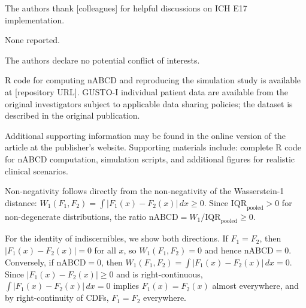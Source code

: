 \documentclass[AMA,Times1COL]{WileyNJDv5}
\begin{document}

The authors thank [colleagues] for helpful discussions on ICH E17 implementation.


None reported.


The authors declare no potential conflict of interests.


R code for computing nABCD and reproducing the simulation study is available at [repository URL]. GUSTO-I individual patient data are available from the original investigators subject to applicable data sharing policies; the dataset is described in the original publication.\cite{gusto1993}




Additional supporting information may be found in the online version of the article at the publisher's website. Supporting materials include: complete R code for nABCD computation, simulation scripts, and additional figures for realistic clinical scenarios.

\appendix



Non-negativity follows directly from the non-negativity of the Wasserstein-1 distance: $W_1(F_1, F_2) = \int |F_1(x) - F_2(x)| \, dx \geq 0$. Since $\text{IQR}_{\text{pooled}} > 0$ for non-degenerate distributions, the ratio $\text{nABCD} = W_1 / \text{IQR}_{\text{pooled}} \geq 0$.

For the identity of indiscernibles, we show both directions. If $F_1 = F_2$, then $|F_1(x) - F_2(x)| = 0$ for all $x$, so $W_1(F_1, F_2) = 0$ and hence $\text{nABCD} = 0$. Conversely, if $\text{nABCD} = 0$, then $W_1(F_1, F_2) = \int |F_1(x) - F_2(x)| \, dx = 0$. Since $|F_1(x) - F_2(x)| \geq 0$ and is right-continuous, $\int |F_1(x) - F_2(x)| \, dx = 0$ implies $F_1(x) = F_2(x)$ almost everywhere, and by right-continuity of CDFs, $F_1 = F_2$ everywhere.
\end{document}
